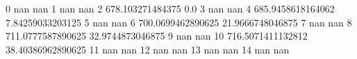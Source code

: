 0 nan nan
1 nan nan
2 678.103271484375 0.0
3 nan nan
4 685.9458618164062 7.84259033203125
5 nan nan
6 700.0699462890625 21.9666748046875
7 nan nan
8 711.0777587890625 32.9744873046875
9 nan nan
10 716.5071411132812 38.40386962890625
11 nan nan
12 nan nan
13 nan nan
14 nan nan
